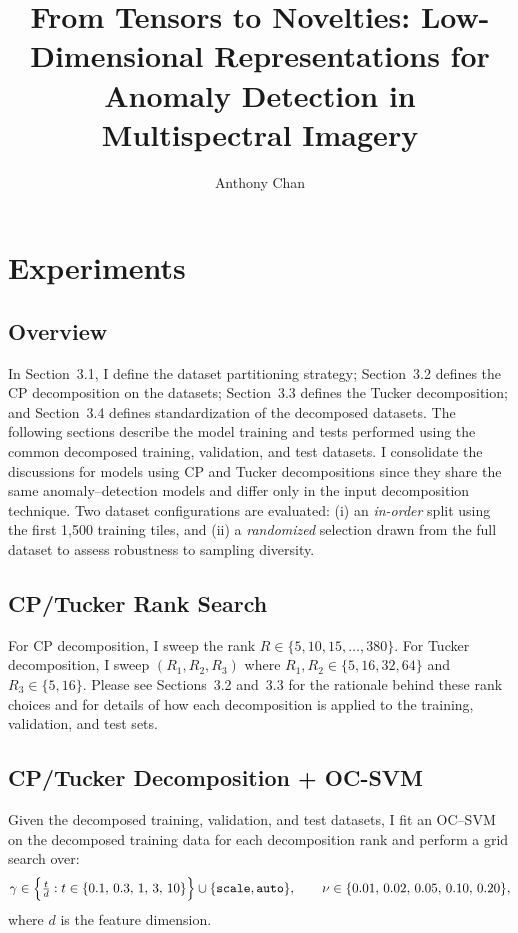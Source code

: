\documentclass[11pt]{article}
\title{\textbf{From Tensors to Novelties: Low-Dimensional Representations for Anomaly Detection in Multispectral Imagery}}
\author{Anthony Chan}
\affil{Georgia Institute of Technology, OMSA ISyE6748 Summer 2024 \\
\texttt{anthonycchan@gmail.com}}
\date{} %
\begin{document}
\maketitle

\section{Experiments}
\label{sec:experiments}

\subsection{Overview}
In Section~3.1, I define the dataset partitioning strategy; Section~3.2 defines the CP decomposition on the datasets; Section~3.3 defines the Tucker decomposition; and Section~3.4 defines standardization of the decomposed datasets. The following sections describe the model training and tests performed using the common decomposed training, validation, and test datasets. I consolidate the discussions for models using CP and Tucker decompositions since they share the same anomaly–detection models and differ only in the input decomposition technique. Two dataset configurations are evaluated: (i) an \textit{in-order} split using the first 1,500 training tiles, and (ii) a \textit{randomized} selection drawn from the full dataset to assess robustness to sampling diversity.

\subsection{CP/Tucker Rank Search}
For CP decomposition, I sweep the rank \(R \in \{5,10,15,\dots,380\}\).
For Tucker decomposition, I sweep \((R_1,R_2,R_3)\) where
\(R_1,R_2 \in \{5,16,32,64\}\) and \(R_3 \in \{5,16\}\).
Please see Sections~3.2 and~3.3 for the rationale behind these rank choices and for details of how each decomposition is applied to the training, validation, and test sets.

\subsection{CP/Tucker Decomposition + OC\texorpdfstring{\textnormal{-}}{}SVM}
Given the decomposed training, validation, and test datasets, I fit an OC\mbox{--}SVM on the decomposed training data for each decomposition rank and perform a grid search over:
\[
\gamma \in \Bigl\{ \tfrac{t}{d} : t \in \{0.1,\,0.3,\,1,\,3,\,10\} \Bigr\} \cup \{\texttt{scale}, \texttt{auto}\},
\qquad
\nu \in \{0.01,\,0.02,\,0.05,\,0.10,\,0.20\},
\]
where \(d\) is the feature dimension.
\end{document}
